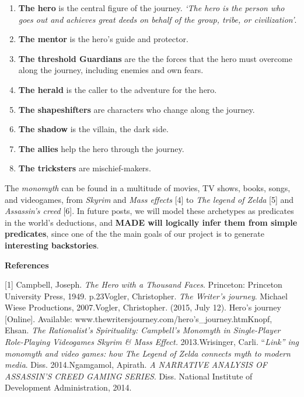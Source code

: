\documentclass[a4paper]{article}
\newcommand\textstyleStrongEmphasis[1]{\textbf{#1}}
\newcommand\textstyleEmphasis[1]{\textit{#1}}
\newcommand\liststyleLvii{%
\renewcommand\theenumi{\arabic{enumi}}
\renewcommand\theenumii{\arabic{enumii}}
\renewcommand\theenumiii{\arabic{enumiii}}
\renewcommand\theenumiv{\arabic{enumiv}}
\renewcommand\labelenumi{\theenumi.}
\renewcommand\labelenumii{\theenumii.}
\renewcommand\labelenumiii{\theenumiii.}
\renewcommand\labelenumiv{\theenumiv.}
}
\begin{document}
\liststyleLvii
\begin{enumerate}
\item \textstyleStrongEmphasis{The hero} is the central figure of the
journey. \textstyleEmphasis{{\textquoteleft}The hero is the person who
goes out and achieves great deeds on behalf of the group, tribe, or
civilization{\textquoteright}}. 
\item \textbf{The mentor} is the hero{\textquoteright}s guide and
protector. 
\item \textbf{The threshold Guardians} are the the forces that the hero
must overcome along the journey, including enemies and own fears. 
\item \textbf{The herald} is the caller to the adventure for the hero. 
\item \textbf{The shapeshifters} are characters who change along the
journey. 
\item \textbf{The shadow }is the villain, the dark side. 
\item \textbf{The allies} help the hero through the journey. 
\item \textbf{The tricksters} are mischief-makers. 
\end{enumerate}
The \textstyleEmphasis{monomyth} can be found in a multitude of movies,
TV shows, books, songs, and videogames, from \textstyleEmphasis{Skyrim}
and \textstyleEmphasis{Mass effects} [4] to \textstyleEmphasis{The
legend of Zelda} [5] and \textstyleEmphasis{Assassin{\textquoteright}s
creed }[6]. In future posts, we will model these archetypes as
predicates in the world{\textquoteright}s deductions, and
\textstyleStrongEmphasis{MADE will logically infer them from simple
predicates}, since one of the the main goals of our project is to
generate \textstyleStrongEmphasis{interesting backstories}.

\textstyleStrongEmphasis{References}

[1] Campbell, Joseph. \textit{The Hero with a Thousand Faces}.
Princeton: Princeton University Press, 1949. p.23\newline
[2] Vogler, Christopher. \textit{The Writer{\textquoteright}s journey}.
Michael Wiese Productions, 2007.\newline
[3] Vogler, Christopher. (2015, July 12). Hero{\textquoteright}s journey
[Online]. Available:
www.thewritersjourney.com/hero{\textquoteright}s\_journey.htm\newline
[4] Knopf, Ehsan. \textstyleEmphasis{The Rationalist{\textquoteright}s
Spirituality: Campbell{\textquoteright}s Monomyth in Single-Player
Role-Playing Videogames Skyrim \& Mass Effect.} 2013.\newline
[5] Wrisinger, Carli.
{\textquotedblleft}\textit{Link{\textquotedblright} ing monomyth and
video games: how The Legend of Zelda connects myth to modern media}.
Diss. 2014.\newline
[6] Ngamgamol, Apirath. \textit{A NARRATIVE ANALYSIS OF
ASSASSIN{\textquoteright}S CREED GAMING SERIES}. Diss. National
Institute of Development Administration, 2014.
\end{document}
